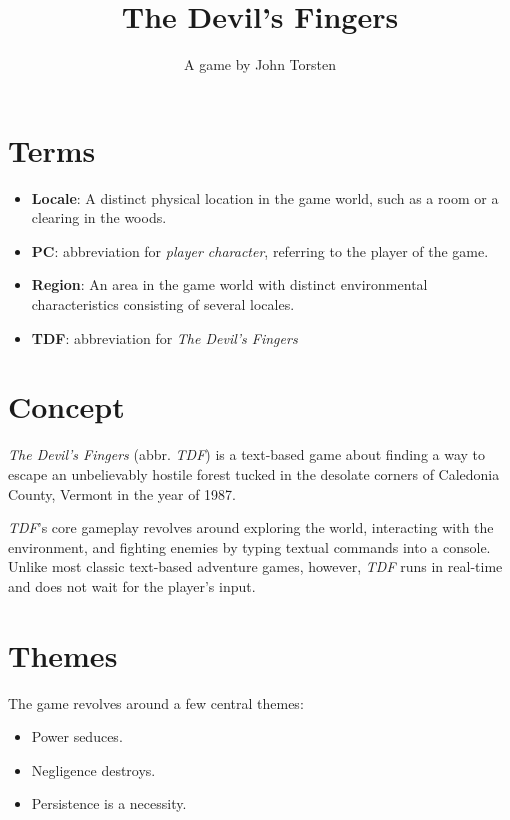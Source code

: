 \documentclass[11pt]{article}
\title{The Devil's Fingers}
\author{A game by John Torsten}
\begin{document}
	\maketitle
	\tableofcontents
	\clearpage

	\section{Terms}
	
	\begin{itemize}
		\item \textbf{Locale}: A distinct physical location in the game world, such as a room or a clearing in the woods.
		\item \textbf{PC}: abbreviation for \textit{player character}, referring to the player of the game.
		\item \textbf{Region}: An area in the game world with distinct environmental characteristics consisting of several locales.
		\item \textbf{TDF}: abbreviation for \textit{The Devil's Fingers}
	\end{itemize}
	
	\section{Concept}
	
	\textit{The Devil's Fingers} (abbr. \textit{TDF}) is a text-based game about finding a way to escape an unbelievably hostile forest tucked in the desolate corners of Caledonia County, Vermont in the year of 1987.
	
	\textit{TDF}'s core gameplay revolves around exploring the world, interacting with the environment, and fighting enemies by typing textual commands into a console. Unlike most classic text-based adventure games, however, \textit{TDF} runs in real-time and does not wait for the player's input.
	
	\section{Themes}
	
	The game revolves around a few central themes:
	
	\begin{itemize}
		\item Power seduces.
		\item Negligence destroys.
		\item Persistence is a necessity.
	\end{itemize}
	
\end{document}
